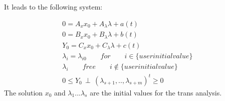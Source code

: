 It leads to the following system:

 \begin{eqnarray}
0=A_{x}x_{0} +A_{\lambda} \lambda +a(t)&\label{eq2}\\
0=B_{x}x_{0}+ B_{\lambda}\lambda + b(t)&\label{eq3}\\
Y_{0}=C_{x}x_{0}+C_{\lambda}\lambda + c(t) &\label{eq4}\\
\lambda_{i} = \lambda_{i0} \qquad for \qquad i \in \{ user initial value \}\\
\lambda_{i} \qquad free \qquad i \notin \{ user initial value \}\\
0 \leq Y_0 \, \perp \, (\lambda_{s+1},..,\lambda_{s+m})^{t} \geq 0&\label{eqperp}
\end{eqnarray}
The solution $x_{0}$ and $\lambda_{1}...\lambda_{s}$ are the initial values for the trans analysis.

